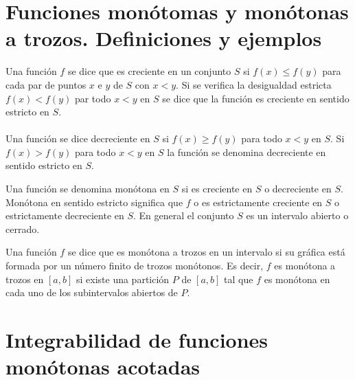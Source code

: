 \setcounter{section}{19}
\section{Funciones monótomas y monótonas a trozos. Definiciones y ejemplos}

\begin{tcolorbox}
    \begin{def.}
	Una función $f$ se dice que es creciente en un conjunto $S$ si $f(x)\leq f(y)$ para cada par de puntos $x$ e $y$ de $S$ con $x<y$. Si se verifica la desigualdad estricta $f(x)<f(y)$ par todo $x<y$ en $S$ se dice que la función es creciente en sentido estricto en $S$.\\\\
	Una función se dice decreciente en $S$ si $f(x)\geq f(y)$ para todo $x<y$ en $S$. Si $f(x)>f(y)$ para todo $x<y$ en $S$ la función se denomina decreciente en sentido estricto en $S$.
    \end{def.}
\end{tcolorbox}

\begin{tcolorbox}
    \begin{def.}
	Una función se denomina monótona en $S$ si es creciente en $S$ o decreciente en $S$. Monótona en sentido estricto significa que $f$ o es estrictamente creciente en $S$ o estrictamente decreciente en $S$. En general el conjunto $S$ es un intervalo abierto o cerrado.
    \end{def.}
\end{tcolorbox}

\begin{tcolorbox}
    \begin{def.}
	Una función $f$ se dice que es monótona a trozos en un intervalo si su gráfica está formada por un número finito de trozos monótonos. Es decir, $f$ es monótona a trozos en $[a,b]$ si existe una partición $P$ de $[a,b]$ tal que $f$ es monótona en cada uno de los subintervalos abiertos de $P$. 
    \end{def.}
\end{tcolorbox}

\section{Integrabilidad de funciones monótonas acotadas}


